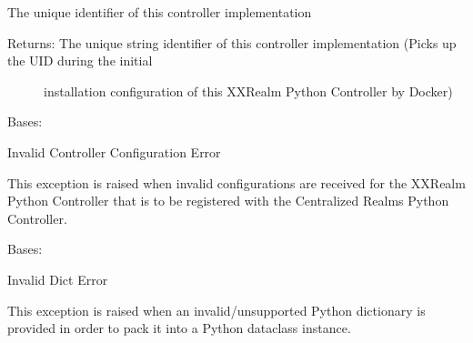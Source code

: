 \documentclass[letterpaper,10pt,english]{sphinxmanual}
\begin{document}
\begin{fulllineitems}
\begin{fulllineitems}
\label{\detokenize{Forge:Forge.Controller.uid}}
\sphinxAtStartPar
The unique identifier of this controller implementation
\begin{description}
\item[{Returns: The unique string identifier of this controller implementation (Picks up the UID during the initial}] \leavevmode
\sphinxAtStartPar
installation configuration of this XXRealm Python Controller by Docker)

\end{description}

\end{fulllineitems}


\end{fulllineitems}


\begin{fulllineitems}
\label{\detokenize{Forge:Forge.InvalidControllerConfiguration}}
\sphinxAtStartPar
Bases: 

\sphinxAtStartPar
Invalid Controller Configuration Error

\sphinxAtStartPar
This exception is raised when invalid configurations are received for the XXRealm Python Controller that is to be
registered with the Centralized Realms Python Controller.

\end{fulllineitems}


\begin{fulllineitems}
\label{\detokenize{Forge:Forge.InvalidDictError}}
\sphinxAtStartPar
Bases: 

\sphinxAtStartPar
Invalid Dict Error

\sphinxAtStartPar
This exception is raised when an invalid/unsupported Python dictionary is provided in order to pack it into a
Python dataclass instance.

\end{fulllineitems}
\end{document}
